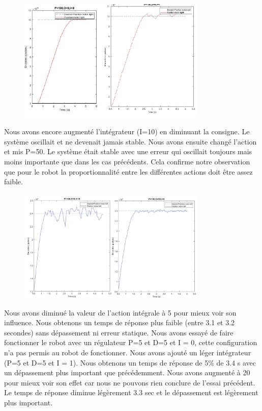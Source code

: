 \documentclass[a4paper]{article}
\begin{document}
		\begin{figure}[h]
			\centering
			\includegraphics[width = 9cm]{imgs/fig2.png}
			\caption{}
		\end{figure}
		Nous avons encore augmenté l’intégrateur (I=10) en diminuant la consigne. Le système oscillait et ne devenait jamais stable. Nous avons ensuite changé l’action et mis P=50. Le système était stable avec une erreur qui oscillait toujours mais moins importante que dans les cas précédents. Cela confirme notre observation que pour le robot la proportionnalité entre les différentes actions doit être assez faible.
		
		\begin{figure}[h]
			\centering
			\includegraphics[width = 9cm]{imgs/fig3.png}
			\caption{}
		\end{figure}
		Nous avons diminué la valeur de l’action intégrale à 5 pour mieux voir son influence. Nous obtenons un temps de réponse plus faible (entre 3.1 et 3.2 secondes) sans dépassement ni erreur statique.
		Nous avons essayé de faire fonctionner le robot avec un régulateur P=5 et D=5 et I = 0, cette configuration n’a pas permis au robot de fonctionner. Nous avons ajouté un léger intégrateur (P=5 et D=5 et I = 1). Nous obtenons un temps de réponse de 5\% de 3.4 s avec un dépassement plus important que précédemment. Nous avons augmenté à 20 pour mieux voir son effet car nous ne pouvons rien conclure de l’essai précédent.  Le temps de réponse diminue légèrement 3.3 sec et le dépassement est légèrement plus important.
		
\end{document}
